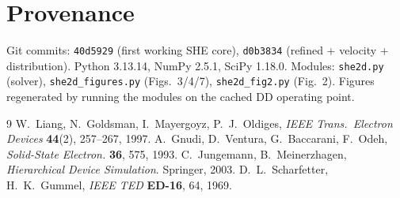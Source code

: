 \documentclass[11pt]{article}
\begin{document}
\section*{Provenance}
Git commits: \texttt{40d5929} (first working SHE core), \texttt{d0b3834} (refined + velocity
+ distribution). Python 3.13.14, NumPy 2.5.1, SciPy 1.18.0. Modules: \texttt{she2d.py}
(solver), \texttt{she2d\_figures.py} (Figs.~3/4/7), \texttt{she2d\_fig2.py} (Fig.~2). Figures
regenerated by running the modules on the cached DD operating point.

\begin{thebibliography}{9}\small
{} W.~Liang, N.~Goldsman, I.~Mayergoyz, P.~J.~Oldiges, \emph{IEEE Trans.\
Electron Devices} \textbf{44}(2), 257--267, 1997.
 A.~Gnudi, D.~Ventura, G.~Baccarani, F.~Odeh, \emph{Solid-State Electron.}
\textbf{36}, 575, 1993.
 C.~Jungemann, B.~Meinerzhagen, \emph{Hierarchical Device Simulation}.
Springer, 2003.
 D.~L.~Scharfetter, H.~K.~Gummel, \emph{IEEE TED} \textbf{ED-16}, 64, 1969.
\end{thebibliography}
\end{document}
